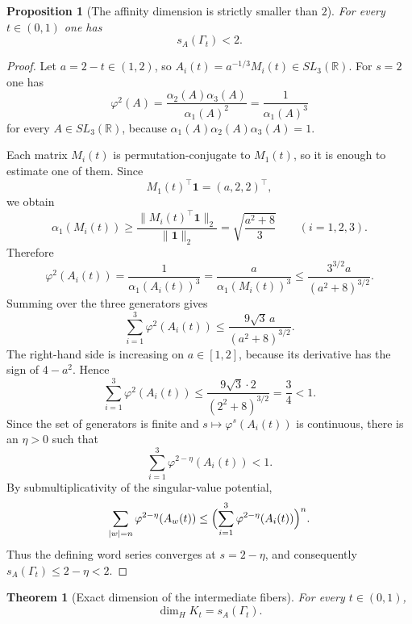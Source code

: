 \documentclass[11pt]{amsart}
\newtheorem{theorem}{Theorem}[section]
\newtheorem{proposition}[proposition]{Proposition}
\theoremstyle{definition}
\newcommand{\R}{\mathbb{R}}
\begin{document}
\begin{proposition}[The affinity dimension is strictly smaller than $2$]\label{prop:sAlesstwo}
For every $t\in(0,1)$ one has
\[
s_A(\Gamma_t)<2.
\]
\end{proposition}

\begin{proof}
Let $a=2-t\in(1,2)$, so $A_i(t)=a^{-1/3}M_i(t)\in SL_3(\R)$. For $s=2$ one has
\[
\varphi^2(A)=\frac{\alpha_2(A)\alpha_3(A)}{\alpha_1(A)^2}=\frac{1}{\alpha_1(A)^3}
\]
for every $A\in SL_3(\R)$, because $\alpha_1(A)\alpha_2(A)\alpha_3(A)=1$.

Each matrix $M_i(t)$ is permutation-conjugate to $M_1(t)$, so it is enough to estimate one of them. Since
\[
M_1(t)^\top \mathbf 1=(a,2,2)^\top,
\]
we obtain
\[
\alpha_1(M_i(t))\ge \frac{\|M_i(t)^\top\mathbf 1\|_2}{\|\mathbf 1\|_2}=\sqrt{\frac{a^2+8}{3}}
\qquad (i=1,2,3).
\]
Therefore
\[
\varphi^2(A_i(t))=\frac{1}{\alpha_1(A_i(t))^3}=\frac{a}{\alpha_1(M_i(t))^3}
\le \frac{3^{3/2}a}{(a^2+8)^{3/2}}.
\]
Summing over the three generators gives
\[
\sum_{i=1}^3 \varphi^2(A_i(t))\le \frac{9\sqrt 3\,a}{(a^2+8)^{3/2}}.
\]
The right-hand side is increasing on $a\in[1,2]$, because its derivative has the sign of $4-a^2$. Hence
\[
\sum_{i=1}^3 \varphi^2(A_i(t))\le \frac{9\sqrt 3\cdot 2}{(2^2+8)^{3/2}}=\frac34<1.
\]
Since the set of generators is finite and $s\mapsto\varphi^s(A_i(t))$ is continuous, there is an $\eta>0$ such that
\[
\sum_{i=1}^3 \varphi^{2-\eta}(A_i(t))<1.
\]
By submultiplicativity of the singular-value potential,
\[
\sum_{|w|=n}\varphi^{2-\eta}(A_w(t))
\le \Bigl(\sum_{i=1}^3\varphi^{2-\eta}(A_i(t))\Bigr)^n.
\]
Thus the defining word series converges at $s=2-\eta$, and consequently $s_A(\Gamma_t)\le 2-\eta<2$.
\end{proof}

\begin{theorem}[Exact dimension of the intermediate fibers]\label{thm:intermediatedimension}
For every $t\in(0,1)$,
\[
\dim_H K_t=s_A(\Gamma_t).
\]
\end{theorem}
\end{document}
